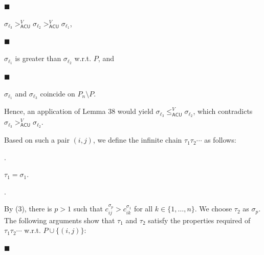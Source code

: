 \par\noindent  $\blacksquare$ 
 
$\sigma_{\ell_{3}}>_{\mathsf{ACU}}^{V}\sigma_{\ell_{2}}>_{\mathsf{ACU}}^{V}%
\sigma_{\ell_{1}}$,\par
 
 
 
\par\noindent  $\blacksquare$ 
 
$\sigma_{\ell_{1}}$ is greater than $\sigma_{\ell_{2}}$ w.r.t. $P$, and\par
 
 
 
\par\noindent  $\blacksquare$ 
 
$\sigma_{\ell_{1}}$ and $\sigma_{\ell_{3}}$ coincide on $P_{n}\setminus P$.\par
 
 
  
Hence, an application of Lemma 38 would yield $\sigma_{\ell_{3}}\leq_{\mathsf{ACU}}^{V}\sigma_{\ell_{2}}$, which contradicts $\sigma_{\ell_{3}}>_{\mathsf{ACU}}^{V}\sigma_{\ell_{2}}$.\par
 
 
 
Based on such a pair $(i,j)$, we define the infinite chain $\tau_{1}\tau_{2}\cdots$ as follows:\par
  
\par{}. 
 
$\tau_{1}=\sigma_{1}$.\par
 
 
 
\par{}. 
 
By (3), there is $p>1$ such that $c^{\sigma_{p}}_{ij}>c^{\sigma_{1}}_{ik}$ for all $k\in\{1,\ldots,n\}$. We choose $\tau_{2}$ as $\sigma_{p}$. The following arguments show that $\tau_{1}$ and $\tau_{2}$ satisfy the properties required of $\tau_{1}\tau_{2}\cdots$ w.r.t. $P\cup\{(i,j)\}$:\par
  
\par\noindent  $\blacksquare$ 
 
